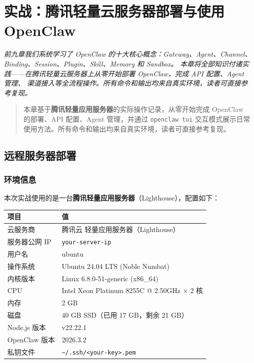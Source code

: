 \chapter{实战：腾讯轻量云服务器部署与使用 OpenClaw}

\vspace{0.5em}
\noindent\textit{前九章我们系统学习了 OpenClaw 的十大核心概念：Gateway、Agent、Channel、Binding、Session、Plugin、Skill、Memory 和 Sandbox。
本章将全部知识付诸实践——在腾讯轻量云服务器上从零开始部署 OpenClaw，完成 API 配置、Agent 管理、
渠道接入等全流程操作。所有命令和输出均来自真实环境，读者可直接参考复现。}
\vspace{0.5em}

\begin{quote}
本章基于\textbf{腾讯轻量应用服务器}的实际操作记录，从零开始完成 OpenClaw 的部署、API 配置、Agent 管理，并通过 \texttt{openclaw tui} 交互模式展示日常使用方法。所有命令和输出均来自真实环境，读者可直接参考复现。
\end{quote}

\section{远程服务器部署}


\subsection{环境信息}

本次实战使用的是一台\textbf{腾讯轻量应用服务器}（Lighthouse），配置如下：

\begin{table}[h]
\centering
\small
\begin{tabular}{|l|p{}|}
\hline
项目 & 值 \\
\hline
云服务商 & 腾讯云 轻量应用服务器（Lighthouse） \\
\hline
服务器公网 IP & \texttt{your-server-ip} \\
\hline
用户名 & ubuntu \\
\hline
操作系统 & Ubuntu 24.04 LTS (Noble Numbat) \\
\hline
内核版本 & Linux 6.8.0-51-generic (x86\_64) \\
\hline
CPU & Intel Xeon Platinum 8255C @ 2.50GHz $\times$ 2 核 \\
\hline
内存 & 2 GB \\
\hline
磁盘 & 40 GB SSD（已用 17 GB，剩余 21 GB） \\
\hline
Node.js 版本 & v22.22.1 \\
\hline
OpenClaw 版本 & 2026.3.2 \\
\hline
私钥文件 & \texttt{\textasciitilde{}/.ssh/<your-key>.pem} \\
\hline
\end{tabular}
\end{table}

